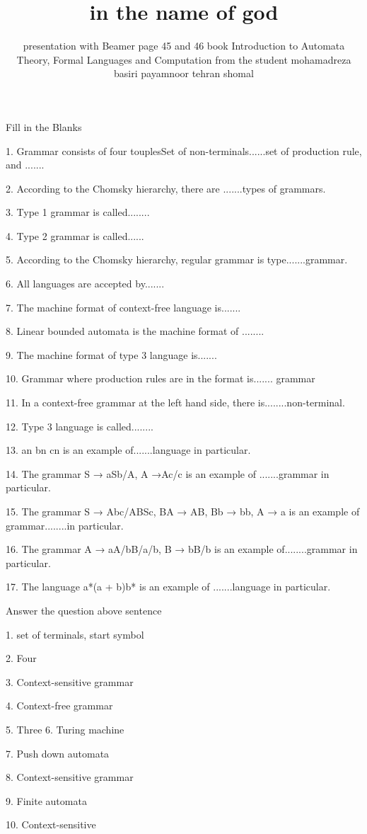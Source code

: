 \documentclass[14pt]{beamer}
\author{presentation with Beamer
page 45 and 46 book Introduction to Automata Theory,
Formal Languages and
Computation
from the student mohamadreza basiri payamnoor tehran
shomal}
\title{in the name of god}
\begin{document}
Fill in the Blanks

 1. Grammar consists of four touplesSet of non-terminals......set of production rule, and
.......
 
 
 2. According to the Chomsky hierarchy, there are .......types of grammars.
 
 
3. Type 1 grammar is called........
 
 
 4. Type 2 grammar is called......
 
 
 5. According to the Chomsky hierarchy, regular grammar is type.......grammar.
 
 
 6. All languages are accepted by.......
 
 
 7. The machine format of context-free language is.......
 
 
 8. Linear bounded automata is the machine format of ........
 
 
 9. The machine format of type 3 language is.......
 
 
 10. Grammar where production rules are in the format  is....... grammar
 
 
 11. In a context-free grammar at the left hand side, there is........non-terminal.
 
 
 12. Type 3 language is called........
 
 
 13. an bn cn is an example of.......language in particular.
 
 
 14. The grammar S → aSb/A, A →Ac/c is an example of .......grammar in particular.
 
 
 15. The grammar S → Abc/ABSc, BA → AB, Bb → bb, A → a is an example of grammar........in particular.
 
 
 16. The grammar A → aA/bB/a/b, B → bB/b is an example of........grammar in particular.


 17. The language a*(a + b)b* is an example of .......language in particular.
 
 
 Answer the question above sentence
  
  
  1. set of terminals, start symbol 
  
  
  2. Four 
  
  
  3. Context-sensitive grammar
  
  
 4. Context-free grammar 
 
 
 5. Three 6. Turing machine
 
 
 7. Push down automata 
 
 
 8. Context-sensitive grammar
 
  
 9. Finite automata
 
 
10. Context-sensitive 
\end{document}
